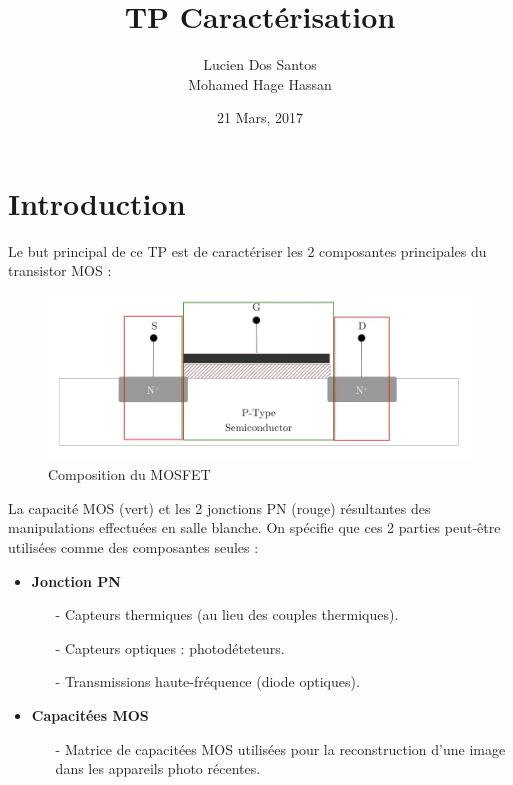 \documentclass[11pt]{article}
\begin{document}
\title{\textbf{TP Caract\'erisation} }
\author{Lucien Dos Santos \\ Mohamed Hage Hassan}
\date{21 Mars, 2017}
\maketitle

\tableofcontents
\clearpage

\section{Introduction}

Le but principal de ce TP est de caract\'eriser les 2 composantes principales du transistor MOS :

\begin{figure}[!htb]
\centering
\includegraphics[scale=0.30]{mosfet_structure_implemented_side_view.jpg}
\caption{Composition du MOSFET}
\end{figure}

La capacit\'e MOS (vert) et les 2 jonctions PN (rouge) r\'esultantes des manipulations effectu\'ees en salle blanche.
On sp\'ecifie que ces 2 parties peut-\^etre utilis\'ees comme des composantes seules :

\begin{itemize}
\item \textbf{Jonction PN}

\begin{itemize}
\item[-] Capteurs thermiques (au lieu des couples thermiques).
\item[-] Capteurs optiques : photod\'eteteurs.
\item[-] Transmissions haute-fr\'equence (diode optiques).
\end{itemize}

\item \textbf{Capacit\'ees MOS}
\begin{itemize}
\item[-] Matrice de capacit\'ees MOS utilis\'ees pour la reconstruction d'une image dans les appareils photo r\'ecentes.
\end{itemize}

\end{itemize}
\end{document}
